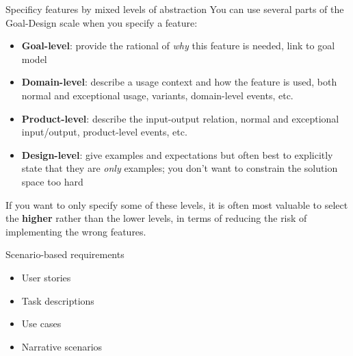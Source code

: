 \documentclass{simpleslides}
\begin{document}
\begin{frame}[fragile]{Specificy features by mixed levels of abstraction}
You can use several parts of the Goal-Design scale when you specify a feature:
  \begin{itemize}
\item \textbf{Goal-level}: provide the rational of \emph{why} this feature is needed, link to goal model 
\item \textbf{Domain-level}: describe a usage context and how the feature is used, both normal and exceptional usage, variants, domain-level events, etc.
\item \textbf{Product-level}: describe the input-output relation, normal and exceptional input/output, product-level events, etc.
\item \textbf{Design-level}: give examples and expectations but often best to explicitly state that they are \emph{only} examples; you don't want to constrain the solution space too hard
\end{itemize}
If you want to only specify some of these levels, it is often most valuable to select the \textbf{higher} rather than the lower levels, in terms of reducing the risk of implementing the wrong features.
\end{frame}

\begin{frame}[fragile]{Scenario-based requirements}
\begin{itemize}
  \item User stories
  \item Task descriptions
  \item Use cases
  \item Narrative scenarios
\end{itemize}
\end{frame}
\end{document}
